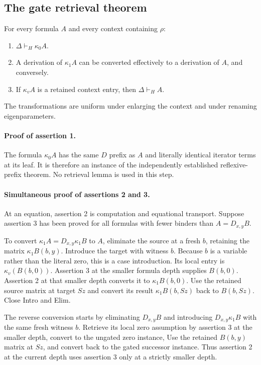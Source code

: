 \documentclass[11pt]{article}
\theoremstyle{definition}\newtheorem{definition}[theorem]{Definition}
\theoremstyle{remark}\newtheorem{remark}[theorem]{Remark}
\begin{document}
\subsection{The gate retrieval theorem}
\label{subsec:gate-retrieval}

For every formula $A$ and every context containing $\rho$:
\begin{enumerate}
\item $\Delta\vdash_H\kappa_0A$.
\item A derivation of $\kappa_1A$ can be converted effectively to a
      derivation of $A$, and conversely.
\item If $\kappa_vA$ is a retained context entry, then
      $\Delta\vdash_H A$.
\end{enumerate}
The transformations are uniform under enlarging the context and under
renaming eigenparameters.

\paragraph{Proof of assertion 1.}
The formula $\kappa_0A$ has the same $D$ prefix as $A$ and literally
identical iterator terms at its leaf.  It is therefore an instance of
the independently established reflexive-prefix theorem.  No retrieval
lemma is used in this step.

\paragraph{Simultaneous proof of assertions 2 and 3.}
At an equation, assertion 2 is computation and equational transport.  Suppose assertion 3 has been proved for all formulas with
fewer binders than $A=D_{x,y}B$.

To convert $\kappa_1A=D_{x,y}\kappa_1B$ to $A$, eliminate the source
at a fresh $b$, retaining the matrix $\kappa_1B(b,y)$.  Introduce the
target with witness $b$.  Because $b$ is a variable rather than the
literal zero, this is a case introduction.  Its local entry is
$\kappa_v(B(b,0))$.  Assertion 3 at the smaller formula depth supplies
$B(b,0)$.  Assertion 2 at that smaller depth converts it to
$\kappa_1B(b,0)$.  Use the retained source matrix at target $Sz$ and
convert its result $\kappa_1B(b,Sz)$ back to $B(b,Sz)$.  Close Intro
and Elim.

The reverse conversion starts by eliminating $D_{x,y}B$ and introducing
$D_{x,y}\kappa_1B$ with the same fresh witness $b$.  Retrieve its local
zero assumption by assertion 3 at the smaller depth, convert to the
ungated zero instance, Use the retained $B(b,y)$ matrix at $Sz$, and
convert back to the gated successor instance.  Thus assertion 2 at the
current depth uses assertion 3 only at a strictly smaller depth.
\end{document}
